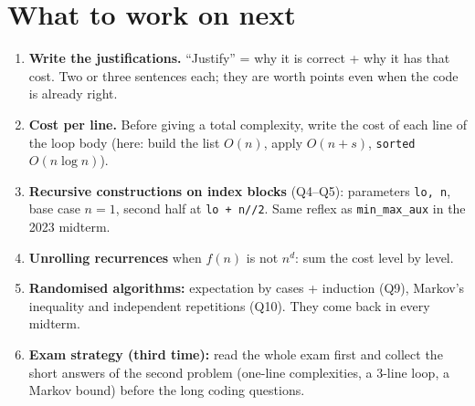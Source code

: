 \documentclass[11pt,a4paper]{article}
\begin{document}
\section{What to work on next}
\begin{enumerate}[leftmargin=1.4em]
\item \textbf{Write the justifications.} ``Justify'' = why it is correct + why it has that cost.
  Two or three sentences each; they are worth points even when the code is already right.
\item \textbf{Cost per line.} Before giving a total complexity, write the cost of each line of
  the loop body (here: build the list $O(n)$, apply $O(n+s)$, \texttt{sorted} $O(n\log n)$).
\item \textbf{Recursive constructions on index blocks} (Q4--Q5): parameters \texttt{lo, n}, base
  case $n=1$, second half at \texttt{lo + n//2}. Same reflex as \texttt{min\_max\_aux} in the 2023
  midterm.
\item \textbf{Unrolling recurrences} when $f(n)$ is not $n^d$: sum the cost level by level.
\item \textbf{Randomised algorithms:} expectation by cases + induction (Q9), Markov's inequality and
  independent repetitions (Q10). They come back in every midterm.
\item \textbf{Exam strategy (third time):} read the whole exam first and collect the short answers
  of the second problem (one-line complexities, a 3-line loop, a Markov bound) before the long
  coding questions.
\end{enumerate}
\end{document}
